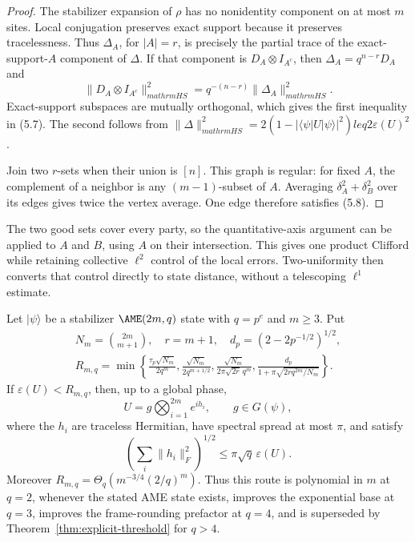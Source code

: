 \begin{proof}
The stabilizer expansion of \(\rho\) has no nonidentity component on at
most \(m\) sites.  Local conjugation preserves exact support because it
preserves tracelessness.  Thus \(\Delta_A\), for \(|A|=r\), is precisely
the partial trace of the exact-support-\(A\) component of \(\Delta\).
If that component is \(D_A\otimes I_{A^c}\), then
\(\Delta_A=q^{n-r}D_A\) and
\[
 \lVert D_A\otimes I_{A^c}\rVert_{mathrm{HS}}^2
 =q^{-(n-r)}\lVert\Delta_A\rVert_{mathrm{HS}}^2.
\]
Exact-support subspaces are mutually orthogonal, which gives the first
inequality in (5.7).  The second follows from
\(\lVert\Delta\rVert_{mathrm{HS}}^2
=2(1-|\langle\psi|U|\psi\rangle|^2)leq2\varepsilon(U)^2\).

Join two \(r\)-sets when their union is \([n]\).  This graph is regular:
for fixed \(A\), the complement of a neighbor is any \((m-1)\)-subset of
\(A\).  Averaging \(\delta_A^2+\delta_B^2\) over its edges gives twice
the vertex average.  One edge therefore satisfies (5.8).
\end{proof}

The two good sets cover every party, so the quantitative-axis argument can
be applied to \(A\) and \(B\), using \(A\) on their intersection.  This
gives one product Clifford while retaining collective \(\ell^2\) control
of the local errors.  Two-uniformity then converts that control directly
to state distance, without a telescoping \(\ell^1\) estimate.

\begin{theorem}
\label{thm:aggregate-global-rounding}
Let \(\lvert\psi\rangle\) be a stabilizer \(\AME(2m,q)\) state with
\(q=p^e\) and \(m\geq3\).  Put
\[
 \begin{gathered}
 N_m=\binom{2m}{m+1},\quad r=m+1,\quad
 d_p=(2-2p^{-1/2})^{1/2},\\
 R_{m,q}=\min\left\{
 \frac{\tau_p\sqrt{N_m}}{2q^m},
 \frac{\sqrt{N_m}}{2q^{m+1/2}},
 \frac{\sqrt{N_m}}{2\pi\sqrt{2r}\,q^m},
 \frac{d_p}{1+\pi\sqrt{2r q^{2m}/N_m}}
 \right\}.                                             \tag{5.9}
 \end{gathered}
\]
If \(\varepsilon(U)<R_{m,q}\), then, up to a global phase,
\[
 U=g\bigotimes_{i=1}^{2m}e^{ih_i},\qquad g\in G(\psi),
\]
where the \(h_i\) are traceless Hermitian, have spectral spread at most
\(\pi\), and satisfy
\[
 \left(\sum_i\lVert h_i\rVert_F^2\right)^{1/2}
 \leq\pi\sqrt q\,\varepsilon(U).                       \tag{5.10}
\]
Moreover \(R_{m,q}=\Theta_q(m^{-3/4}(2/q)^m)\).  Thus this route is
polynomial in \(m\) at \(q=2\), whenever the stated AME state exists,
improves the exponential base at \(q=3\),
improves the frame-rounding prefactor at \(q=4\), and is superseded by
Theorem~\ref{thm:explicit-threshold} for \(q>4\).
\end{theorem}

